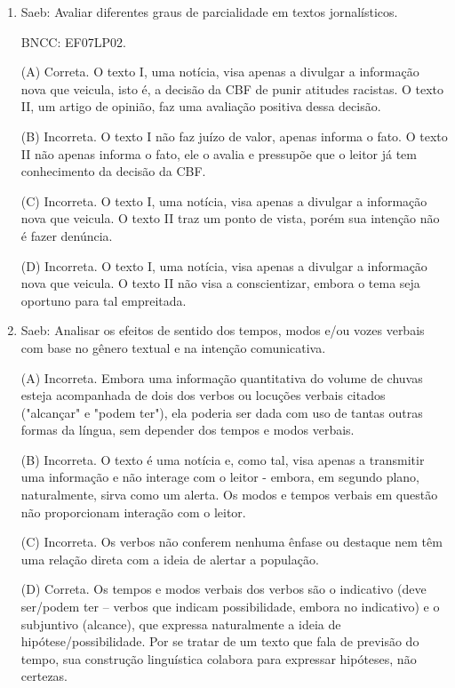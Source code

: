 \begin{enumerate}
(D) Incorreta. O texto II tem sua construção pautada no seu
público-alvo, as crianças, sobretudo por meio de ilustrações. Porém,
somente entretê-las não se relaciona com a notícia do texto I; a baixa
cobertura vacinal citada no texto I se relaciona com a necessidade de
atrair a população para vacinar suas crianças.

\item

Saeb: Avaliar diferentes graus de parcialidade em textos jornalísticos.

BNCC: EF07LP02.

(A) Correta. O texto I, uma notícia, visa apenas a divulgar a informação
nova que veicula, isto é, a decisão da CBF de punir atitudes racistas. O
texto II, um artigo de opinião, faz uma avaliação positiva dessa
decisão.

(B) Incorreta. O texto I não faz juízo de valor, apenas informa o fato.
O texto II não apenas informa o fato, ele o avalia e pressupõe que o
leitor já tem conhecimento da decisão da CBF.

(C) Incorreta. O texto I, uma notícia, visa apenas a divulgar a informação
nova que veicula. O texto II traz um ponto de vista, porém sua intenção
não é fazer denúncia.

(D) Incorreta. O texto I, uma notícia, visa apenas a divulgar a informação
nova que veicula. O texto II não visa a conscientizar, embora o tema seja
oportuno para tal empreitada.

\item

Saeb: Analisar os efeitos de sentido dos tempos, modos e/ou vozes
verbais com base no gênero textual e na intenção comunicativa.


(A) Incorreta. Embora uma informação quantitativa do volume de chuvas
esteja acompanhada de dois dos verbos ou locuções verbais citados ("alcançar" e "podem ter"),
ela poderia ser dada com uso de tantas outras formas da língua, sem
depender dos tempos e modos verbais.

(B) Incorreta. O texto é uma notícia e, como tal, visa apenas a transmitir
uma informação e não interage com o leitor - embora, em segundo plano, naturalmente, sirva como um alerta. Os modos e tempos verbais em
questão não proporcionam interação com o leitor.

(C) Incorreta. Os verbos não conferem nenhuma ênfase ou destaque nem têm
uma relação direta com a ideia de alertar a população.

(D) Correta. Os tempos e modos verbais dos verbos são o indicativo (deve
ser/podem ter -- verbos que indicam possibilidade, embora no indicativo)
e o subjuntivo (alcance), que expressa naturalmente a ideia de
hipótese/possibilidade. Por se tratar de um texto que fala de previsão
do tempo, sua construção linguística colabora para expressar hipóteses, 
não certezas.



\end{enumerate}
